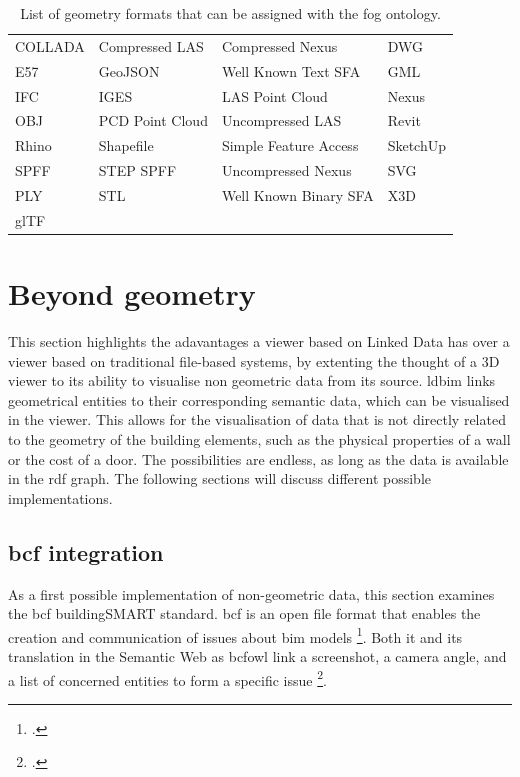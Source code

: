 \begin{table}[H]
    \centering
    \begin{tabular}{llll}
        \toprule
        COLLADA & Compressed LAS  & Compressed Nexus      & DWG      \\
        E57     & GeoJSON         & Well Known Text SFA   & GML      \\
        IFC     & IGES            & LAS Point Cloud       & Nexus    \\
        OBJ     & PCD Point Cloud & Uncompressed LAS      & Revit    \\
        Rhino   & Shapefile       & Simple Feature Access & SketchUp \\
        SPFF    & STEP SPFF       & Uncompressed Nexus    & SVG      \\
        PLY     & STL             & Well Known Binary SFA & X3D      \\
        glTF    &                 &                       &          \\ \bottomrule
    \end{tabular}
    \caption[\acs{fog} ontology geometry formats]{List of geometry formats that can be assigned with the \acs{fog} ontology.\footnotemark}
    \label{tab:geometryFormats}
\end{table}

\section{Beyond geometry}
This section highlights the adavantages a viewer based on Linked Data has over a viewer based on traditional file-based systems, by extenting the thought of a 3D viewer to its ability to visualise non geometric data from its source. \ac{ldbim} links geometrical entities to their corresponding semantic data, which can be visualised in the viewer. This allows for the visualisation of data that is not directly related to the geometry of the building elements, such as the physical properties of a wall or the cost of a door. The possibilities are endless, as long as the data is available in the \ac{rdf} graph. The following sections will discuss different possible implementations.


\subsection{\acs{bcf} integration} \label{sec:bcf}
As a first possible implementation of non-geometric data, this section examines the \ac{bcf} buildingSMART standard. \ac{bcf} is an open file format that enables the creation and communication of issues about \ac{bim} models \footcite{bcf}. Both it and its translation in the Semantic Web as \ac{bcfowl} \parencite{bcfOWL} link a screenshot, a camera angle, and a list of concerned entities to form a specific issue \footcite{bcfCollab}.

